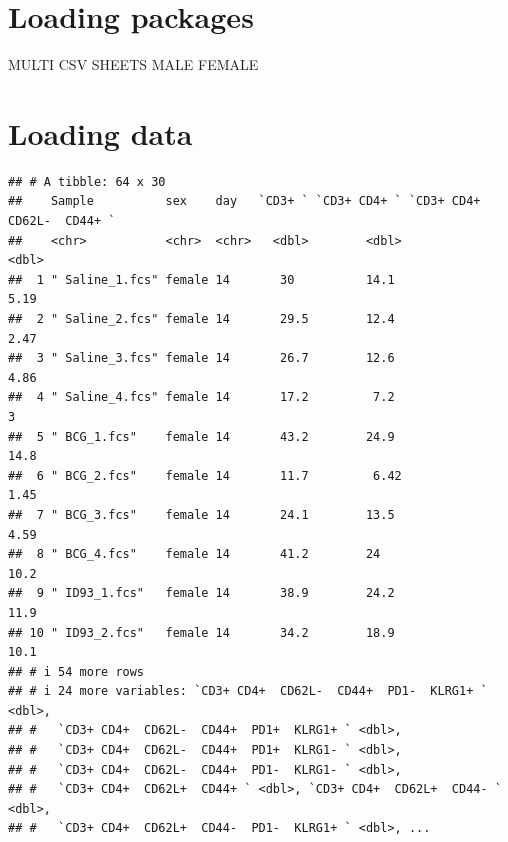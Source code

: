 \documentclass[
]{book}
\begin{document}
\hypertarget{loading-packages}{%
\section{Loading packages}\label{loading-packages}}

MULTI CSV SHEETS MALE FEMALE

\hypertarget{loading-data}{%
\section{Loading data}\label{loading-data}}

\begin{verbatim}
## # A tibble: 64 x 30
##    Sample          sex    day   `CD3+ ` `CD3+ CD4+ ` `CD3+ CD4+  CD62L-  CD44+ `
##    <chr>           <chr>  <chr>   <dbl>        <dbl>                       <dbl>
##  1 " Saline_1.fcs" female 14       30          14.1                         5.19
##  2 " Saline_2.fcs" female 14       29.5        12.4                         2.47
##  3 " Saline_3.fcs" female 14       26.7        12.6                         4.86
##  4 " Saline_4.fcs" female 14       17.2         7.2                         3   
##  5 " BCG_1.fcs"    female 14       43.2        24.9                        14.8 
##  6 " BCG_2.fcs"    female 14       11.7         6.42                        1.45
##  7 " BCG_3.fcs"    female 14       24.1        13.5                         4.59
##  8 " BCG_4.fcs"    female 14       41.2        24                          10.2 
##  9 " ID93_1.fcs"   female 14       38.9        24.2                        11.9 
## 10 " ID93_2.fcs"   female 14       34.2        18.9                        10.1 
## # i 54 more rows
## # i 24 more variables: `CD3+ CD4+  CD62L-  CD44+  PD1-  KLRG1+ ` <dbl>,
## #   `CD3+ CD4+  CD62L-  CD44+  PD1+  KLRG1+ ` <dbl>,
## #   `CD3+ CD4+  CD62L-  CD44+  PD1+  KLRG1- ` <dbl>,
## #   `CD3+ CD4+  CD62L-  CD44+  PD1-  KLRG1- ` <dbl>,
## #   `CD3+ CD4+  CD62L+  CD44+ ` <dbl>, `CD3+ CD4+  CD62L+  CD44- ` <dbl>,
## #   `CD3+ CD4+  CD62L+  CD44-  PD1-  KLRG1+ ` <dbl>, ...
\end{verbatim}
\end{document}
